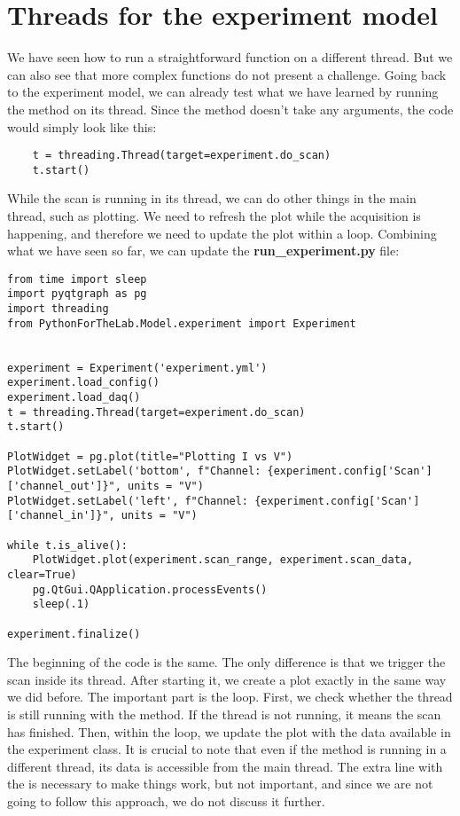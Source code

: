 \section{Threads for the experiment model}\label{sec:threads-experiment-model}
We have seen how to run a straightforward function on a different thread. But we can also see that more complex functions do not present a challenge. Going back to the experiment model, we can already test what we have learned by running the  method on its thread. Since the method doesn't take any arguments, the code would simply look like this:

\begin{verbatim}
    t = threading.Thread(target=experiment.do_scan)
    t.start()
\end{verbatim}

While the scan is running in its thread, we can do other things in the main thread, such as plotting. We need to refresh the plot while the acquisition is happening, and therefore we need to update the plot within a loop. Combining what we have seen so far, we can update the \textbf{run\_experiment.py} file:

\begin{verbatim}
from time import sleep
import pyqtgraph as pg
import threading
from PythonForTheLab.Model.experiment import Experiment


experiment = Experiment('experiment.yml')
experiment.load_config()
experiment.load_daq()
t = threading.Thread(target=experiment.do_scan)
t.start()

PlotWidget = pg.plot(title="Plotting I vs V")
PlotWidget.setLabel('bottom', f"Channel: {experiment.config['Scan']['channel_out']}", units = "V")
PlotWidget.setLabel('left', f"Channel: {experiment.config['Scan']['channel_in']}", units = "V")

while t.is_alive():
    PlotWidget.plot(experiment.scan_range, experiment.scan_data, clear=True)
    pg.QtGui.QApplication.processEvents()
    sleep(.1)

experiment.finalize()
\end{verbatim}

The beginning of the code is the same. The only difference is that we trigger the scan inside its thread. After starting it, we create a plot exactly in the same way we did before. The important part is the  loop. First, we check whether the thread is still running with the  method. If the thread is not running, it means the scan has finished. Then, within the loop, we update the plot with the data available in the experiment class. It is crucial to note that even if the  method is running in a different thread, its data is accessible from the main thread. The extra line with the  is necessary to make things work, but not important, and since we are not going to follow this approach, we do not discuss it further.

